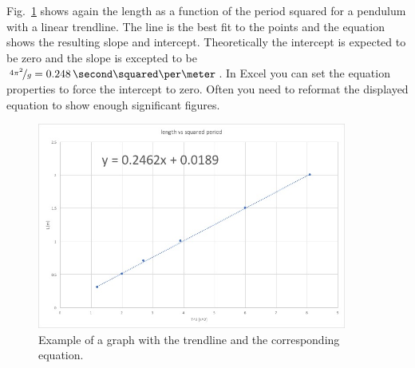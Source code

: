 Fig.~\ref{fig:graph2} shows again the length as a function of the period squared for a pendulum with a linear trendline. The line is the best fit to the points and the equation shows the resulting slope and intercept. Theoretically the intercept is expected to be zero and the slope is excepted to be $\nicefrac{4\pi^2}{g}=0.248\,\second\squared\per\meter$.  In Excel you can set the equation properties to force the intercept to zero. Often you need to reformat the displayed equation to show enough significant figures.

\begin{figure}%
  \begin{center}
    \includegraphics[width=4in]{IntroductionFigures/graph2.jpg}
  \end{center}
  \caption{Example of a graph with the trendline  and the corresponding equation.}
  \label{fig:graph2}
\end{figure}
